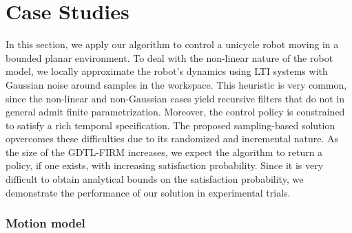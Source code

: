 \section{Case Studies}
\label{sec:caseStudy}

In this section, we apply our algorithm to control a unicycle robot
moving in a bounded planar environment.
To deal with the non-linear nature of the robot model,
we locally approximate the robot's dynamics using LTI systems
with Gaussian noise around samples in the workspace.
This heuristic is very common, since the non-linear and
non-Gaussian cases yield recursive filters that do not
in general admit finite parametrization.
Moreover, the control policy is constrained to satisfy a
rich temporal specification.
The proposed sampling-based solution opvercomes %
these difficulties due to its randomized and incremental
nature.
As the size of the GDTL-FIRM increases, we expect
the algorithm to return a policy, if one exists, with
increasing satisfaction probability.
Since it is very difficult to obtain analytical bounds on
the satisfaction probability, we demonstrate the
performance of our solution in experimental trials.

\subsubsection{Motion model}


